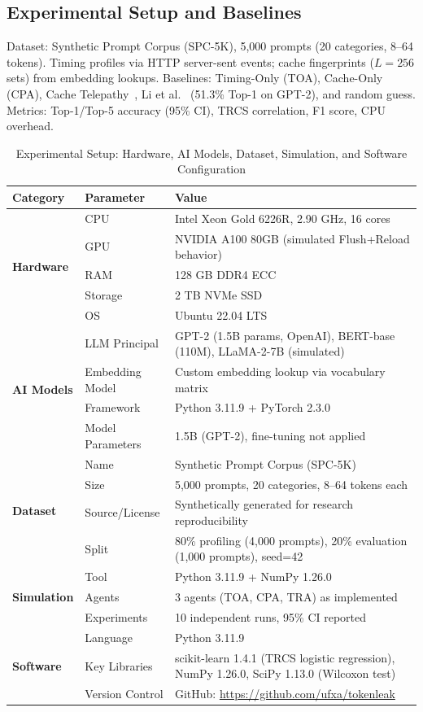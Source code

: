 \documentclass[conference,10pt,twocolumn]{IEEEtran}
\begin{document}
\subsection{Experimental Setup and Baselines}

Dataset: Synthetic Prompt Corpus (SPC-5K), 5{,}000 prompts (20 categories,
8--64 tokens). Timing profiles via HTTP server-sent events; cache
fingerprints ($L=256$ sets) from embedding lookups. Baselines:
Timing-Only (TOA), Cache-Only (CPA), Cache Telepathy~\cite{yan2020cache},
Li et al.~\cite{li2024prompt} (51.3\% Top-1 on GPT-2), and random guess.
Metrics: Top-1/Top-5 accuracy (95\% CI), TRCS correlation, F1 score, CPU overhead.

\begin{table}[!t]
\caption{Experimental Setup: Hardware, AI Models, Dataset, Simulation, and Software Configuration}
\label{tab:setup}
\begin{tabularx}{\textwidth}{l X X}
\toprule
\textbf{Category} & \textbf{Parameter} & \textbf{Value} \\
\midrule
\multirow{5}{*}{\textbf{Hardware}} & CPU & Intel Xeon Gold 6226R, 2.90 GHz, 16 cores \\
& GPU & NVIDIA A100 80GB (simulated Flush+Reload behavior) \\
& RAM & 128 GB DDR4 ECC \\
& Storage & 2 TB NVMe SSD \\
& OS & Ubuntu 22.04 LTS \\
\midrule
\multirow{4}{*}{\textbf{AI Models}} & LLM Principal & GPT-2 (1.5B params, OpenAI), BERT-base (110M), LLaMA-2-7B (simulated) \\
& Embedding Model & Custom embedding lookup via vocabulary matrix \\
& Framework & Python 3.11.9 + PyTorch 2.3.0 \\
& Model Parameters & 1.5B (GPT-2), fine-tuning not applied \\
\midrule
\multirow{4}{*}{\textbf{Dataset}} & Name & Synthetic Prompt Corpus (SPC-5K) \\
& Size & 5{,}000 prompts, 20 categories, 8--64 tokens each \\
& Source/License & Synthetically generated for research reproducibility \\
& Split & 80\% profiling (4{,}000 prompts), 20\% evaluation (1{,}000 prompts), seed=42 \\
\midrule
\multirow{3}{*}{\textbf{Simulation}} & Tool & Python 3.11.9 + NumPy 1.26.0 \\
& Agents & 3 agents (TOA, CPA, TRA) as implemented \\
& Experiments & 10 independent runs, 95\% CI reported \\
\midrule
\multirow{3}{*}{\textbf{Software}} & Language & Python 3.11.9 \\
& Key Libraries & scikit-learn 1.4.1 (TRCS logistic regression), NumPy 1.26.0, SciPy 1.13.0 (Wilcoxon test) \\
& Version Control & GitHub: \url{https://github.com/ufxa/tokenleak} \\
\bottomrule
\end{tabularx}
\end{table}
\end{document}
